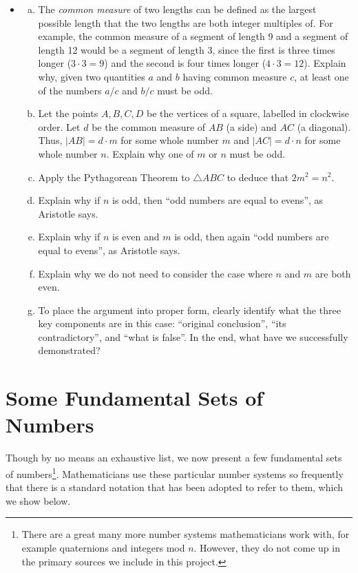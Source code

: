 \documentclass[11pt]{article}
\newcounter{tasknumb}
\newcommand{\tasknumb}[1]{\refstepcounter{tasknumb}\textmd{\textbf{$\fbox{$\fbox{Task \thetasknumb}$}$}}#1}
\newenvironment{task}[1][]%
 {\begin{itemize}
 \item[\tasknumb{#1}]  }
{
    \end{itemize}    }%
\begin{document}
\begin{task}[\label{sqrt2}]
\begin{enumerate}[(a)]
    \item The \emph{common measure} of two lengths can be defined as the largest possible length that the two lengths are both integer multiples of.  For example, the common measure of a segment of length 9 and a segment of length 12 would be a segment of length 3, since the first is three times longer ($3\cdot 3=9$) and the second is four times longer ($4 \cdot 3=12$).  Explain why, given two quantities $a$ and $b$ having common measure $c$, at least one of the numbers $a/c$ and $b/c$ must be odd. 
    \item Let the points $A,B,C,D$ be the vertices of a square, labelled in clockwise order.  Let $d$ be the common measure of $AB$ (a side) and $AC$ (a diagonal).  Thus, $|AB|=d\cdot m$ for some whole number $m$ and $|AC|=d \cdot n$ for some whole number $n$.  Explain why one of $m$ or $n$ must be odd.
    \item Apply the Pythagorean Theorem to  $\triangle ABC$ to deduce that $2m^2=n^2$.  \item Explain why if $n$ is odd, then ``{\sf odd numbers are equal to evens}'', as Aristotle says.
    \item Explain why if $n$ is even and $m$ is odd, then again ``{\sf odd numbers are equal to evens}'', as Aristotle says.
    \item Explain why we do not need to consider the case where $n$ and $m$ are both even.
    \item To place the argument into proper form, clearly identify what the three key components are in this case:  ``{\sf original conclusion}'', ``{\sf its contradictory}'',
    and ``{\sf what is false}''.  In the end, what have we successfully demonstrated?
    \end{enumerate}
\end{task}

\section{Some Fundamental Sets of Numbers}\label{numbers}

 Though by no means an exhaustive list, we now present a few fundamental sets of numbers\footnote{There are a great many more number systems mathematicians work with, for example quaternions and integers mod $n$. However, they do not come up in the primary sources we include in this project.}.  Mathematicians use these particular number systems so frequently that there is a standard notation that has been adopted to refer to them, which we show below.
 
\end{document}
